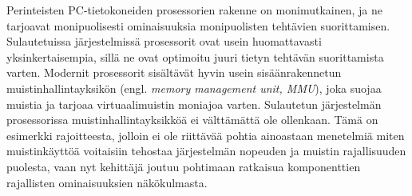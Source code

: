 Perinteisten PC-tietokoneiden prosessorien rakenne on monimutkainen, ja ne tarjoavat monipuolisesti ominaisuuksia monipuolisten tehtävien suorittamisen. Sulautetuissa järjestelmissä prosessorit ovat usein huomattavasti yksinkertaisempia, sillä ne ovat optimoitu juuri tietyn tehtävän suorittamista varten. Modernit prosessorit sisältävät hyvin usein sisäänrakennetun muistinhallintayksikön (engl. \textit{memory management unit, MMU}), joka suojaa muistia ja tarjoaa virtuaalimuistin moniajoa varten. Sulautetun järjestelmän prosessorissa muistinhallintayksikköä ei välttämättä ole ollenkaan.\cite{rtcfes2015book} Tämä on esimerkki rajoitteesta, jolloin ei ole riittävää pohtia ainoastaan menetelmiä miten muistinkäyttöä voitaisiin tehostaa järjestelmän nopeuden ja muistin rajallisuuden puolesta, vaan nyt kehittäjä joutuu pohtimaan ratkaisua komponenttien rajallisten ominaisuuksien näkökulmasta.